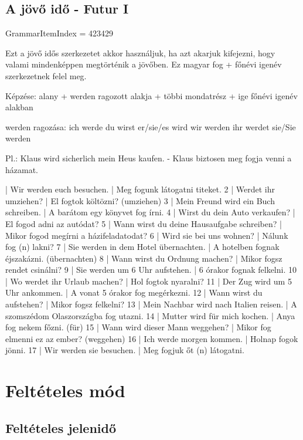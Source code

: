 \documentclass{article}
\newenvironment{desc}{\verbatim}{\endverbatim}
\newenvironment{exmp}{\verbatim}{\endverbatim}
\begin{document}
\subsection{A jövő idő - Futur I}

GrammarItemIndex = 423429

\begin{desc}
Ezt a jövő idős szerkezetet akkor használjuk, ha azt akarjuk kifejezni, hogy valami mindenképpen megtörténik a jövőben. Ez magyar fog + főnévi igenév szerkezetnek felel meg.

Képzése: alany + werden ragozott alakja + többi mondatrész + ige főnévi igenév alakban

werden ragozása:
ich werde
du wirst
er/sie/es wird
wir werden
ihr werdet
sie/Sie werden

Pl.: Klaus wird sicherlich mein Heus kaufen. - Klaus biztosen meg fogja venni a házamat.
\end{desc}

\begin{exmp}
1 | Wir werden euch besuchen. | Meg fogunk látogatni titeket.
2 | Werdet ihr umziehen? | El fogtok költözni? (umziehen)
3 | Mein Freund wird ein Buch schreiben. | A barátom egy könyvet fog írni.
4 | Wirst du dein Auto verkaufen? | El fogod adni az autódat?
5 | Wann wirst du deine Hausaufgabe schreiben? | Mikor fogod megírni a házifeladatodat?
6 | Wird sie bei uns wohnen? | Nálunk fog (n) lakni?
7 | Sie werden in dem Hotel übernachten. | A hotelben fognak éjszakázni. (übernachten)
8 | Wann wirst du Ordnung machen? | Mikor fogsz rendet csinálni?
9 | Sie werden um 6 Uhr aufstehen. | 6 órakor fognak felkelni.
10 | Wo werdet ihr Urlaub machen? | Hol fogtok nyaralni?
11 | Der Zug wird um 5 Uhr ankommen. | A vonat 5 órakor fog megérkezni.
12 | Wann wirst du aufstehen? | Mikor fogsz felkelni?
13 | Mein Nachbar wird nach Italien reisen. | A szomszédom Olaszországba fog utazni.
14 | Mutter wird für mich kochen. | Anya fog nekem főzni. (für)
15 | Wann wird dieser Mann weggehen? | Mikor fog elmenni ez az ember? (weggehen)
16 | Ich werde morgen kommen. | Holnap fogok jönni.
17 | Wir werden sie besuchen. | Meg fogjuk őt (n) látogatni.
\end{exmp}

\section{Feltételes mód}

\subsection{Feltételes jelenidő}
\end{document}
